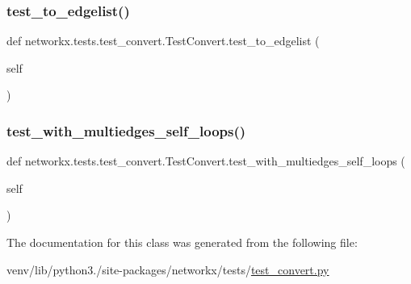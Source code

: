 \subsubsection{\texorpdfstring{test\+\_\+to\+\_\+edgelist()}{test\_to\_edgelist()}}
{\footnotesize\ttfamily def networkx.\+tests.\+test\+\_\+convert.\+Test\+Convert.\+test\+\_\+to\+\_\+edgelist (\begin{DoxyParamCaption}\item[{}]{self }\end{DoxyParamCaption})}

\mbox{\label{classnetworkx_1_1tests_1_1test__convert_1_1TestConvert_a2e41e4bc087d633a7c4de2e3b64d39b1}} 
\subsubsection{\texorpdfstring{test\+\_\+with\+\_\+multiedges\+\_\+self\+\_\+loops()}{test\_with\_multiedges\_self\_loops()}}
{\footnotesize\ttfamily def networkx.\+tests.\+test\+\_\+convert.\+Test\+Convert.\+test\+\_\+with\+\_\+multiedges\+\_\+self\+\_\+loops (\begin{DoxyParamCaption}\item[{}]{self }\end{DoxyParamCaption})}



The documentation for this class was generated from the following file\+:\begin{DoxyCompactItemize}
\item 
venv/lib/python3./site-\/packages/networkx/tests/\hyperlink{test__convert_8py}{test\+\_\+convert.\+py}\end{DoxyCompactItemize}
